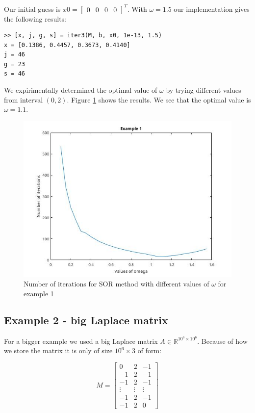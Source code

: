 \documentclass[]{article}
\begin{document}
Our initial guess is $x0 = \begin{bmatrix}
	0 & 0 & 0 & 0
\end{bmatrix}^T$. With $\omega = 1.5$ our implementation gives the following results:

\begin{lstlisting}
>> [x, j, g, s] = iter3(M, b, x0, 1e-13, 1.5)
x = [0.1386, 0.4457, 0.3673, 0.4140]
j = 46
g = 23
s = 46
\end{lstlisting}

We expirimentally determined the optimal value of $\omega$ by trying different
values from interval $(0, 2)$. Figure \ref{fig:1-omega} shows the results. We
see that the optimal value is $\omega = 1.1$.

\begin{figure}
	\centering
	\includegraphics[width=\linewidth]{pics/test1-omega.jpg}
	\caption{Number of iterations for SOR method with different values of
		$\omega$ for example 1}
	\label{fig:1-omega}
\end{figure}


\subsection{Example 2 - big Laplace matrix}

For a bigger example we used a big Laplace matrix $A \in \mathbb{R}^{10^6 \times
10^6}$. Because of how we store the matrix it is only of size $10^6 \times 3$ of
form:

\begin{equation*}
	M = \begin{bmatrix}
		0 & 2 & -1 \\
		-1 & 2 & -1 \\
		-1 & 2 & -1 \\
		\vdots & \vdots & \vdots \\
		-1 & 2 & -1 \\
		-1 & 2 & 0
	\end{bmatrix}
\end{equation*}
\end{document}
